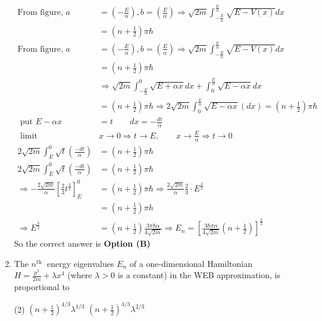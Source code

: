 \begin{enumerate}
\begin{answer}
\begin{align*}
\text{From figure, }a&=\left(-\frac{E}{\alpha}\right), b=\left(\frac{E}{\alpha}\right) \Rightarrow \sqrt{2 m} \int_{-\frac{E}{\alpha}}^{\frac{E}{\alpha}} \sqrt{E-V(x)} d x\\&=\left(n+\frac{1}{2}\right) \pi \hbar\\
\text{From figure, }a&=\left(-\frac{E}{\alpha}\right), b=\left(\frac{E}{\alpha}\right) \Rightarrow \sqrt{2 m} \int_{-\frac{E}{\alpha}}^{\frac{E}{\alpha}} \sqrt{E-V(x)} d x\\&=\left(n+\frac{1}{2}\right) \pi \hbar\\
&\Rightarrow \sqrt{2 m} \int_{-\frac{E}{\alpha}}^{0} \sqrt{E+\alpha x} d x+\int_{0}^{\frac{E}{\alpha}} \sqrt{E-\alpha x} d x\\&=\left(n+\frac{1}{2}\right) \pi \hbar \Rightarrow 2 \sqrt{2 m} \int_{0}^{\frac{E}{\alpha}} \sqrt{E-\alpha x}(d x)=\left(n+\frac{1}{2}\right) \pi \hbar\\
\text{	put }E-\alpha x&=t\quad\quad
d x=-\frac{d t}{\alpha}\\
\text{	limit }&x \rightarrow 0 \Rightarrow t \rightarrow E, \quad \quad x \rightarrow \frac{E}{\alpha} \Rightarrow t \rightarrow 0\\
2 \sqrt{2 m} \int_{E}^{0} \sqrt{t}\left(\frac{-d t}{\alpha}\right)&=\left(n+\frac{1}{2}\right) \pi \hbar\\
2 \sqrt{2 m} \int_{E}^{0} \sqrt{t}\left(\frac{-d t}{\alpha}\right)&=\left(n+\frac{1}{2}\right) \pi \hbar\\
\Rightarrow-\frac{2 \sqrt{2 m}}{\alpha}\left[\frac{2}{3} t^{\frac{3}{2}}\right]_{E}^{0}&=\left(n+\frac{1}{2}\right) \pi \hbar \Rightarrow \frac{2 \sqrt{2 m}}{\alpha} \frac{2}{3} \cdot E^{\frac{3}{2}}\\&=\left(n+\frac{1}{2}\right) \pi h\\
\Rightarrow E^{\frac{3}{2}}&=\left(n+\frac{1}{2}\right) \frac{3 \pi \hbar \alpha}{4 \sqrt{2 m}} \Rightarrow E_{n}=\left[\frac{3 \hbar \pi \alpha}{4 \sqrt{2 m}}\left(n+\frac{1}{2}\right)\right]^{\frac{2}{3}}
\end{align*}
So the correct answer is \textbf{Option (B)}
\end{answer}	
\item The $n^{\text {th }}$ energy eigenvalues $E_{n}$ of a one-dimensional Hamiltonian $H=\frac{p^{2}}{2 m}+\lambda x^{4}$ (where $\lambda>0$ is a constant) in the WEB approximation, is proportional to
{}
\begin{tasks}(2)
\task[\textbf{A.}] $\left(n+\frac{1}{2}\right)^{4 / 3} \lambda^{1 / 3}$
\task[\textbf{B.}] $\left(n+\frac{1}{2}\right)^{4 / 3} \lambda^{2 / 3}$

\end{tasks}
\end{enumerate}
